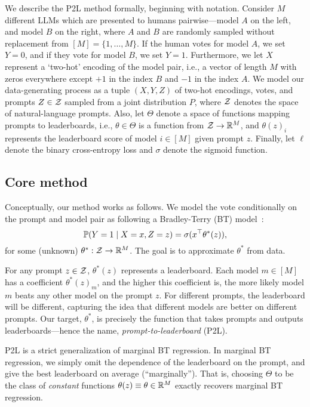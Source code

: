 We describe the P2L method formally, beginning with notation. 
Consider $M$ different LLMs which are presented to humans pairwise---model $A$ on the left, and model $B$ on the right, where $A$ and $B$ are randomly sampled without replacement from $[M] = \{1, \ldots, M\}$.
If the human votes for model $A$, we set $Y=0$, and if they vote for model $B$, we set $Y=1$.
Furthermore, we let $X$ represent a `two-hot' encoding of the model pair, i.e., a vector of length $M$ with zeros everywhere except $+1$ in the index $B$ and $-1$ in the index $A$.
We model our data-generating process as a tuple $(X,Y,Z)$ of two-hot encodings, votes, and prompts $Z \in \mathcal{Z}$ sampled from a joint distribution $P$, where $\mathcal{Z}$ denotes the space of natural-language prompts.
Also, let $\Theta$ denote a space of functions mapping prompts to leaderboards, i.e., $\theta \in \Theta$ is a function from $\mathcal{Z} \to \mathbb{R}^M$, and $\theta(z)_i$ represents the leaderboard score of model $i \in [M]$ given prompt $z$.
Finally, let $\ell$ denote the binary cross-entropy loss and $\sigma$ denote the sigmoid function.

\subsection{Core method}
\label{sec:core-method}

Conceptually, our method works as follows.
We model the vote conditionally on the prompt and model pair as following a Bradley-Terry (BT) model~\cite{bradley1952rank}:
\begin{equation}
    \label{eq:prompt-BT}
    \P(Y = 1 \mid X = x, Z = z) = \sigma(x^\top\theta^*(z)),
\end{equation}
for some (unknown) $\theta^* : \mathcal{Z} \to \mathbb{R}^M$.
The goal is to approximate $\theta^*$ from data.

For any prompt $z \in \mathcal{Z}$, $\theta^*(z)$ represents a leaderboard.
Each model $m \in [M]$ has a coefficient $\theta^*(z)_m$, and the higher this coefficient is, the more likely model $m$ beats any other model on the prompt $z$.
For different prompts, the leaderboard will be different, capturing the idea that different models are better on different prompts.
Our target, $\theta^*$, is precisely the function that takes prompts and outputs leaderboards---hence the name, \emph{prompt-to-leaderboard} (P2L).

P2L is a strict generalization of marginal BT regression.
In marginal BT regression, we simply omit the dependence of the leaderboard on the prompt, and give the best leaderboard on average (``marginally'').
That is, choosing $\Theta$ to be the class of \emph{constant} functions $\theta(z) \equiv \theta \in \mathbb{R}^M$ exactly recovers marginal BT regression.

